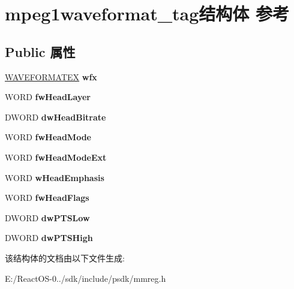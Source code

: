 \hypertarget{structmpeg1waveformat__tag}{}\section{mpeg1waveformat\+\_\+tag结构体 参考}
\label{structmpeg1waveformat__tag}
\subsection*{Public 属性}
\begin{DoxyCompactItemize}
\item 
\mbox{\label{structmpeg1waveformat__tag_aaa9aa53d64a66803dff4c51700e2629e}} 
\hyperlink{struct_w_a_v_e_f_o_r_m_a_t_e_x}{W\+A\+V\+E\+F\+O\+R\+M\+A\+T\+EX} {\bfseries wfx}
\item 
\mbox{\label{structmpeg1waveformat__tag_a88ce083fb805e888039947da95410098}} 
W\+O\+RD {\bfseries fw\+Head\+Layer}
\item 
\mbox{\label{structmpeg1waveformat__tag_a8de538b0b65c99e148b434bad83bf676}} 
D\+W\+O\+RD {\bfseries dw\+Head\+Bitrate}
\item 
\mbox{\label{structmpeg1waveformat__tag_a0e8089b44789e1823bd441dd7db75c77}} 
W\+O\+RD {\bfseries fw\+Head\+Mode}
\item 
\mbox{\label{structmpeg1waveformat__tag_a9f246cf772bd948ab54703fea71f04ab}} 
W\+O\+RD {\bfseries fw\+Head\+Mode\+Ext}
\item 
\mbox{\label{structmpeg1waveformat__tag_af5ba413e85d8501e95b4f831a8001bcb}} 
W\+O\+RD {\bfseries w\+Head\+Emphasis}
\item 
\mbox{\label{structmpeg1waveformat__tag_abd6188530a31c890d86efcdd7176d2e6}} 
W\+O\+RD {\bfseries fw\+Head\+Flags}
\item 
\mbox{\label{structmpeg1waveformat__tag_a348dc08eedf88ee32822eb99c1af640d}} 
D\+W\+O\+RD {\bfseries dw\+P\+T\+S\+Low}
\item 
\mbox{\label{structmpeg1waveformat__tag_aef578cbdb29b63529aede9a8fd1c3e50}} 
D\+W\+O\+RD {\bfseries dw\+P\+T\+S\+High}
\end{DoxyCompactItemize}


该结构体的文档由以下文件生成\+:\begin{DoxyCompactItemize}
\item 
E\+:/\+React\+O\+S-\/0../sdk/include/psdk/mmreg.\+h\end{DoxyCompactItemize}
